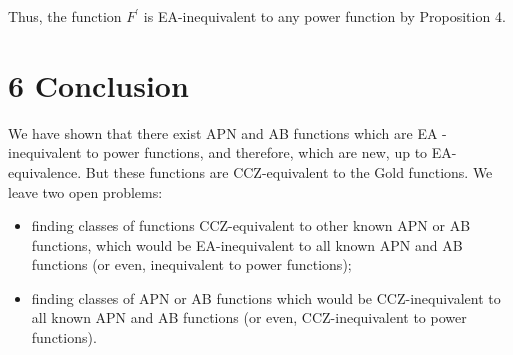 \documentclass[10pt]{article}
\begin{document}
Thus, the function $F^{\prime}$ is EA-inequivalent to any power function by Proposition 4.

\section*{6 Conclusion}
We have shown that there exist APN and AB functions which are EA -inequivalent to power functions, and therefore, which are new, up to EA-equivalence. But these functions are CCZ-equivalent to the Gold functions. We leave two open problems:

\begin{itemize}
  \item finding classes of functions CCZ-equivalent to other known APN or AB functions, which would be EA-inequivalent to all known APN and AB functions (or even, inequivalent to power functions);
  \item finding classes of APN or AB functions which would be CCZ-inequivalent to all known APN and AB functions (or even, CCZ-inequivalent to power functions).
\end{itemize}
\end{document}
